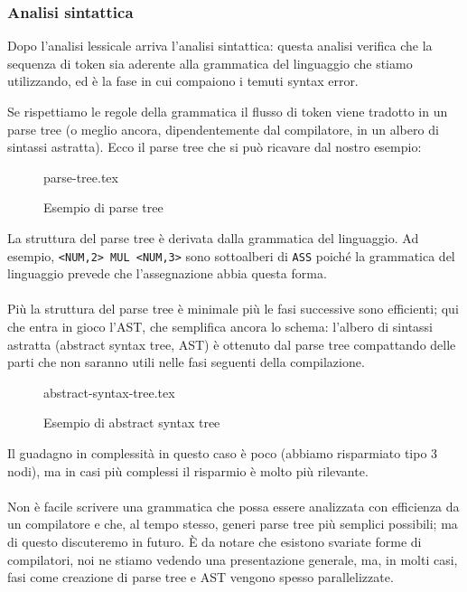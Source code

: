\documentclass[class=book, crop=false, oneside, 12pt]{standalone}
\begin{document}
\subsubsection{Analisi sintattica}
Dopo l’analisi lessicale arriva l’analisi sintattica: questa analisi verifica che la sequenza di token sia aderente alla grammatica del linguaggio che stiamo utilizzando, ed è la fase in cui compaiono i temuti syntax error.

Se rispettiamo le regole della grammatica il flusso di token viene tradotto in un parse tree (o meglio ancora, dipendentemente dal compilatore, in un albero di sintassi astratta). Ecco il parse tree che si può ricavare dal nostro esempio:
\begin{figure}[H]
	\centering
	{parse-tree.tex}
	\caption{Esempio di parse tree}
\end{figure}
La struttura del parse tree è derivata dalla grammatica del linguaggio. Ad esempio, \texttt{<NUM,2> MUL <NUM,3>} sono sottoalberi di \texttt{ASS} poiché la grammatica del linguaggio prevede che l’assegnazione abbia questa forma. 

\paragraph{}
Più la struttura del parse tree è minimale più le fasi successive sono efficienti; qui che entra in gioco l’AST, che semplifica ancora lo schema: l’albero di sintassi astratta (abstract syntax tree, AST) è ottenuto dal parse tree compattando delle parti che non saranno utili nelle fasi seguenti della compilazione.
\begin{figure}[H]
	\centering
	{abstract-syntax-tree.tex}
	\caption{Esempio di abstract syntax tree}
	\label{esempioAST}
\end{figure}
Il guadagno in complessità in questo caso è poco (abbiamo risparmiato tipo 3 nodi), ma in casi più complessi il risparmio è molto più rilevante.
\paragraph*{}
Non è facile scrivere una grammatica che possa essere analizzata con efficienza da un compilatore e che, al tempo stesso, generi parse tree più semplici possibili; ma di questo discuteremo in futuro. È da notare che esistono svariate forme di compilatori, noi ne stiamo vedendo una presentazione generale, ma, in molti casi, fasi come creazione di parse tree e AST vengono spesso parallelizzate.
\end{document}
